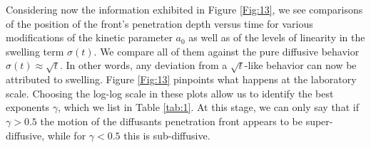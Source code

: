\documentclass{article}
\begin{document}
 Considering now the information exhibited in Figure \ref{Fig:13}, we see comparisons of  the position of the front's penetration depth versus time for various modifications of the kinetic parameter $a_0$ as well as of the levels of linearity in the swelling term $\sigma(t)$. We compare all of them against the pure diffusive behavior $\sigma(t)\approx \sqrt{t}$. In other words, any deviation from a $\sqrt{t}$-like behavior can now be attributed to swelling.  Figure  \ref{Fig:13}  pinpoints what happens at the laboratory scale.
 Choosing the log-log scale in these plots allow us to identify the best exponents $\gamma$, which we list in Table \ref{tab:1}. At this stage, we can only say that if $\gamma> 0.5$ the motion of the diffusants penetration front appears to be super-diffusive, while for $\gamma< 0.5$ this is sub-diffusive.
\end{document}
